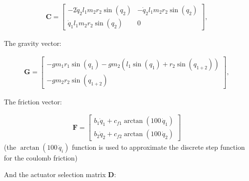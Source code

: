     \begin{equation}
    \begin{split}
    \mathbf{C} = \left[
    \begin{matrix}
    -2 \dot{q}_2 l_{1} m_{2} r_{2} \sin(q_2) & -\dot{q}_2 l_{1} m_{2} r_{2} \sin(q_2)\\
    \dot{q}_1 l_{1} m_{2} r_{2} \sin(q_2) & 0
    \end{matrix}
    \right],
    \label{eq:coriolis_matrix}
    \end{split}
    \end{equation}
    
    The gravity vector:
    
    \begin{equation}
    \begin{split}
    \mathbf{G} = \left[
    \begin{matrix}
    - g m_{1} r_{1} \sin(q_1) - g m_{2} \left(l_{1} \sin(q_1) + r_{2} \sin(q_{1+2}) \right) \\
    - g m_{2} r_{2} \sin(q_{1+2})
    \end{matrix}
    \right],
    \label{eq:gravity_matrix}
    \end{split}
    \end{equation}
    
    The friction vector:
    
    \begin{equation}
        \begin{split}
            \mathbf{F} =
            \left[
                \begin{matrix}
                    b_1 \dot{q}_1 + c_{f1} \arctan(100\,\dot{q}_1) \\
                    b_2 \dot{q}_2 + c_{f2} \arctan(100\,\dot{q}_2)
                \end{matrix}
            \right]
        \end{split}
        \label{eq:friction_function}
    \end{equation}
    (the \(\arctan(100\,\dot{q}_i)\) function is used to approximate the discrete step function for the coulomb friction)

    And the actuator selection matrix \(\mathbf{D}\):
    
